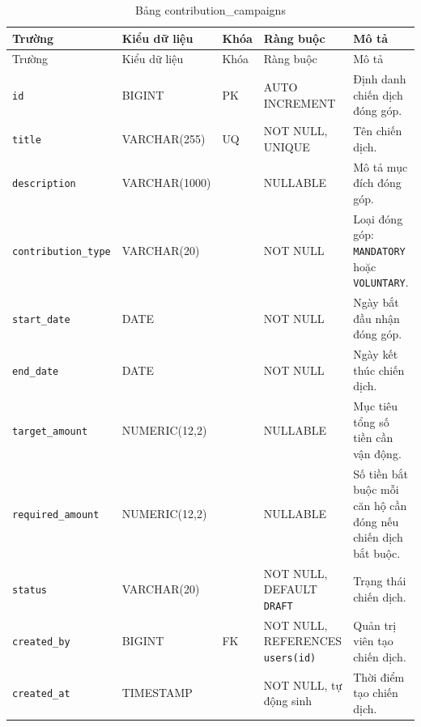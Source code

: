 ﻿\documentclass[12pt,a4paper]{report}
\begin{document}
\begin{longtable}{L{4.2cm} L{2.15cm} L{0.75cm} L{3.05cm} L{4.0cm}}
\caption{Bảng contribution\_campaigns}\label{tab:db-contribution-campaigns}\\
\toprule
Trường & Kiểu dữ liệu & Khóa & Ràng buộc & Mô tả \\
\midrule
\endfirsthead
\toprule Trường & Kiểu dữ liệu & Khóa & Ràng buộc & Mô tả \\\midrule
\endhead
\texttt{id} & BIGINT & PK & AUTO INCREMENT & Định danh chiến dịch đóng góp. \\
\texttt{title} & VARCHAR(255) & UQ & NOT NULL, UNIQUE & Tên chiến dịch. \\
\texttt{description} & VARCHAR(1000) & & NULLABLE & Mô tả mục đích đóng góp. \\
\texttt{contribution\_type} & VARCHAR(20) & & NOT NULL & Loại đóng góp: \texttt{MANDATORY} hoặc \texttt{VOLUNTARY}. \\
\texttt{start\_date} & DATE & & NOT NULL & Ngày bắt đầu nhận đóng góp. \\
\texttt{end\_date} & DATE & & NOT NULL & Ngày kết thúc chiến dịch. \\
\texttt{target\_amount} & NUMERIC(12,2) & & NULLABLE & Mục tiêu tổng số tiền cần vận động. \\
\texttt{required\_amount} & NUMERIC(12,2) & & NULLABLE & Số tiền bắt buộc mỗi căn hộ cần đóng nếu chiến dịch bắt buộc. \\
\texttt{status} & VARCHAR(20) & & NOT NULL, DEFAULT \texttt{DRAFT} & Trạng thái chiến dịch. \\
\texttt{created\_by} & BIGINT & FK & NOT NULL, REFERENCES \texttt{users(id)} & Quản trị viên tạo chiến dịch. \\
\texttt{created\_at} & TIMESTAMP & & NOT NULL, tự động sinh & Thời điểm tạo chiến dịch. \\
\bottomrule
\end{longtable}
\end{document}
